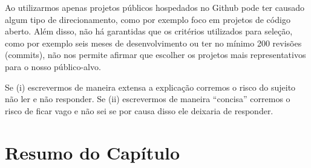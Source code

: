 Ao utilizarmos apenas projetos públicos hospedados no Github pode ter causado
algum tipo de direcionamento, como por exemplo foco em projetos de código
aberto. Além disso, não há garantidas que os critérios utilizados para seleção,
como por exemplo seis meses de desenvolvimento ou ter no mínimo 200 revisões
(commits), não nos permite afirmar que escolher os projetos mais
representativos para o nosso público-alvo.

Se (i) escrevermos de maneira extensa a explicação corremos o risco do sujeito
não ler e não responder. Se (ii) escrevermos de maneira ``concisa'' corremos o
risco de ficar vago e não sei se por causa disso ele deixaria de responder.

\section{Resumo do Capítulo}
\label{sec:sug_melhoria_resumo}
